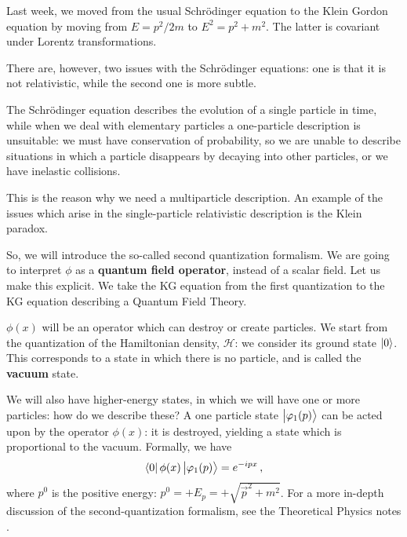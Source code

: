 \documentclass[main.tex]{subfiles}
\begin{document}

Last week, we moved from the usual Schrödinger equation to the Klein Gordon equation by moving from \(E = p^2 / 2m\) to \(E^2 = p^2 + m^2\). 
The latter is covariant under Lorentz transformations. 

There are, however, two issues with the Schrödinger equations:
one is that it is not relativistic, while the second one is more subtle. 

The Schrödinger equation describes the evolution of a single particle in time, while when we deal with elementary particles a one-particle description is unsuitable: we must have conservation of probability, so we are unable to describe situations in which a particle disappears by decaying into other particles, or we have inelastic collisions. 

This is the reason why we need a multiparticle description. 
An example of the issues which arise in the single-particle relativistic description is the Klein paradox. 

So, we will introduce the so-called second quantization formalism. 
We are going to interpret \(\phi \) as a \textbf{quantum field operator}, instead of a scalar field. Let us make this explicit. 
We take the KG equation from the first quantization to the KG equation describing a Quantum Field Theory. 

\(\phi (x)\) will be an operator which can destroy or create particles. 
We start from the quantization of the Hamiltonian density, \(\mathscr{H}\): we consider its ground state \(\ket{0}\). 
This corresponds to a state in which there is no particle, and is called the \textbf{vacuum} state. 

We will also have higher-energy states, in which we will have one or more particles: how do we describe these? 
A one particle state \(\ket{\varphi_{1 } (p)}\) can be acted upon by the operator \(\phi (x)\): it is destroyed, yielding a state which is proportional to the vacuum. Formally, we have 
%
\begin{align}
\bra{0} \phi (x) \ket{\varphi_1 (p)} = e^{-ipx}
\,,
\end{align}
%
where \(p^{0}\) is the positive energy: \(p^{0} = + E_p = + \sqrt{\vec{p}^2 + m^2}\). 
For a more in-depth discussion of the second-quantization formalism, see the Theoretical Physics notes \cite[section 2.4]{tissinoTheoreticalPhysicsNotes2020}.
\end{document}

